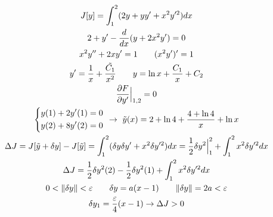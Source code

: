 \documentclass{article}
\begin{document}
\begin{eg}
  \begin{gather*}
    J[y]=\int_{1}^{2}(2y+yy'+x^{2}y'^{2})dx \\ 
    2+y'-\frac{d}{dx}(y+2x^{2}y')=0 \\ 
    x^{2}y'' + 2xy' =1 \qquad (x^{2}y')'=1 \\ 
    y'=\frac{1}{x}+\frac{\tilde{C_1}}{x^{2}} \qquad y =\ln x + \frac{C_1}{x} + C_2 \\ 
    \frac{\partial{F}}{\partial{y'}}\Big|_{1,2}=0 \\ 
    \left\{\begin{aligned}
      & y(1) + 2y'(1) = 0 \\ 
      & y(2) + 8 y'(2) =0 
    \end{aligned}\right. \ \rightarrow \ \tilde{y}(x)=2+\ln 4 + \frac{4+ \ln 4}{x} + \ln x \\ 
    \Delta J = J[\tilde{y}+\delta y] - J[\tilde{y}]=\int_{1}^{2}(\delta y \delta y' + x^{2} \delta y'^{2})dx
    = \frac{1}{2}\delta y^{2} \Big|_{1}^{2} + \int_{1}^{2}x^{2}\delta y'^{2}dx \\ 
    \Delta J = \frac{1}{2}\delta y^{2}(2) - \frac{1}{2}\delta y^{2}(1) + \int_{1}^{2}x^{2}\delta y'^{2}dx \\ 
    0<\Vert \delta y \Vert < \varepsilon \qquad \delta y = a(x-1) \qquad \Vert \delta y \Vert=2a < \varepsilon \\ 
    \delta y_1 = \frac{\varepsilon}{4}(x-1) \rightarrow \Delta J > 0
  \end{gather*}
\end{eg}
\end{document}
